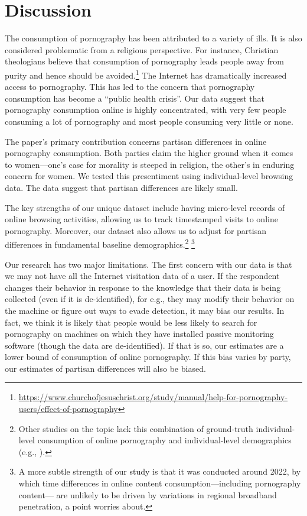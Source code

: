 \documentclass[12pt,twoside]{article}
\begin{document}
\section{Discussion}
\label{sec:discussion}
The consumption of pornography has been attributed to a variety of ills. It is also considered problematic from a religious perspective. For instance, Christian theologians believe that consumption of pornography leads people away from purity and hence should be avoided.\footnote{\url{https://www.churchofjesuschrist.org/study/manual/help-for-pornography-users/effect-of-pornography}} The Internet has dramatically increased access to pornography. This has led to the concern that pornography consumption has become a ``public health crisis''. Our data suggest that pornography consumption online is highly concentrated, with very few people consuming a lot of pornography and most people consuming very little or none.

The paper's primary contribution concerns partisan differences in online pornography consumption. Both parties claim the higher ground when it comes to women—one's case for morality is steeped in religion, the other's in enduring concern for women. We tested this presentiment using individual-level browsing data. The data suggest that partisan differences are likely small.

The key strengths of our unique dataset include having micro-level records of online browsing activities, allowing us to track timestamped visits to online pornography. Moreover, our dataset also allows us to adjust for partisan differences in fundamental baseline demographics.\footnote{Other studies on the topic lack this combination of ground-truth individual-level consumption of online pornography and individual-level demographics (e.g., \cite{Peek1982-ua, Woodrum1992-vk, Markey2011-xo, Perry2020-cp, Ybarra2005-id, Perry2018-cw, Price2016-sm, webporn, Wright2013-gl}).} \footnote{A more subtle strength of our study is that it was conducted around 2022, by which time differences in online content consumption---including pornography content--- are unlikely to be driven by variations in regional broadband penetration, a point \cite{edelman2009markets} worries about.}

Our research has two major limitations. The first concern with our data is that we may not have all the Internet visitation data of a user. If the respondent changes their behavior in response to the knowledge that their data is being collected (even if it is de-identified), for e.g., they may modify their behavior on the machine or figure out ways to evade detection, it may bias our results. In fact, we think it is likely that people would be less likely to search for pornography on machines on which they have installed passive monitoring software (though the data are de-identified). If that is so, our estimates are a lower bound of consumption of online pornography. If this bias varies by party, our estimates of partisan differences will also be biased. 
\end{document}
